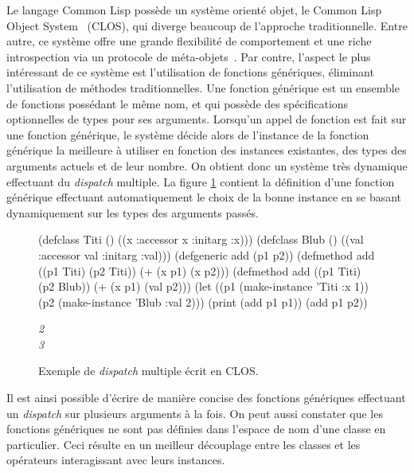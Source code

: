 \documentclass[12pt,oneside,letterpaper,francais]{book}
\begin{document}
Le langage Common Lisp possède un système orienté objet, le Common
Lisp Object System~\cite{CLOS} (CLOS), qui diverge beaucoup de
l'approche traditionnelle. Entre autre, ce système offre une grande
flexibilité de comportement et une riche introspection via un
protocole de méta-objets~\cite{MOP}. Par contre, l'aspect le plus
intéressant de ce système est l'utilisation de fonctions génériques,
éliminant l'utilisation de méthodes traditionnelles. Une fonction
générique est un ensemble de fonctions possédant le même nom, et qui
possède des spécifications optionnelles de types pour ses
arguments. Lorsqu'un appel de fonction est fait sur une fonction
générique, le système décide alors de l'instance de la fonction
générique la meilleure à utiliser en fonction des instances
existantes, des types des arguments actuels et de leur nombre. On
obtient donc un système très dynamique effectuant du \textit{dispatch}
multiple. La figure \ref{OO:CLOS_ex} contient la définition d'une
fonction générique effectuant automatiquement le choix de la bonne
instance en se basant dynamiquement sur les types des arguments
passés.

\begin{figure}[htb!]
  \begin{schemecode}
(defclass Titi () ((x :accessor x :initarg :x)))
(defclass Blub () ((val :accessor val :initarg :val)))
(defgeneric add (p1 p2))
(defmethod add ((p1 Titi) (p2 Titi)) (+ (x p1) (x p2)))
(defmethod add ((p1 Titi) (p2 Blub)) (+ (x p1) (val p2)))
(let ((p1 (make-instance 'Titi :x 1))
            (p2 (make-instance 'Blub :val 2)))
        (print (add p1 p1))
        (add p1 p2))
  \end{schemecode}
  {{\it
2\\
3}}
  \caption{Exemple de \textit{dispatch} multiple écrit en CLOS.}
  \label{OO:CLOS_ex}
\end{figure}

Il est ainsi possible d'écrire de manière concise des fonctions
génériques effectuant un \textit{dispatch} sur plusieurs arguments à
la fois. On peut aussi constater que les fonctions génériques ne sont
pas définies dans l'espace de nom d'une classe en particulier. Ceci
résulte en un meilleur découplage entre les classes et les opérateurs
interagissant avec leurs instances.
\end{document}
